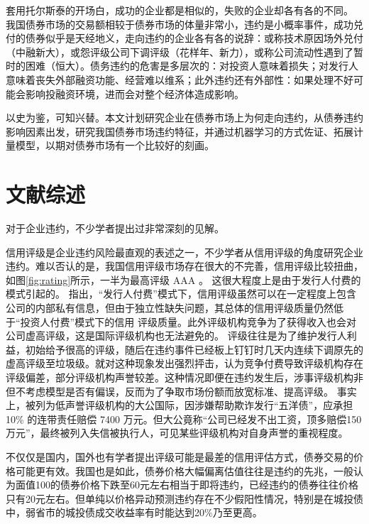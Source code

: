 套用托尔斯泰的开场白，成功的企业都是相似的，失败的企业却各有各的不同。
我国债券市场的交易额相较于债券市场的体量非常小，违约是小概率事件，成功兑付的债券似乎是天经地义，走向违约的企业各有各的说辞：或称技术原因场外兑付（中融新大），或怨评级公司下调评级（花样年、新力），或称公司流动性遇到了暂时的困难（恒大）。债务违约的危害是多层次的：对投资人意味着损失；对发行人意味着丧失外部融资功能、经营难以维系；此外违约还有外部性：如果处理不好可能会影响投融资环境，进而会对整个经济体造成影响。

以史为鉴，可知兴替。本文计划研究企业在债券市场上为何走向违约，从债券违约影响因素出发，研究我国债券市场违约特征，并通过机器学习的方式佐证、拓展计量模型，以期对债券市场有一个比较好的刻画。

\section{文献综述}
\label{sec:zs}
对于企业违约，不少学者提出过非常深刻的见解。

信用评级是企业违约风险最直观的表述之一，不少学者从信用评级的角度研究企业违约。难以否认的是，我国信用评级市场存在很大的不完善，信用评级比较扭曲，如图\ref{fig:rating}所示，一半为最高评级 AAA 。
这很大程度上是由于发行人付费的模式引起的。\Textcite{吴育辉2020} 指出，“发行人付费”模式下，信用评级虽然可以在一定程度上包含公司的内部私有信息，但由于独立性缺失问题，其总体的信用评级质量仍然低于“投资人付费”模式下的信用 评级质量。此外评级机构竞争为了获得收入也会对公司虚高评级，这是国际评级机构也无法避免的。
评级往往是为了维护发行人利益，初始给予很高的评级，随后在违约事件已经板上钉钉时几天内连续下调原先的虚高评级至垃圾级。\Textcite{陈关亭2021多重信用评级与债券融资成本}就对这种现象发出强烈抨击，认为竞争付费导致评级机构存在评级偏差，部分评级机构声誉较差。这种情况即便在违约发生后，涉事评级机构非但不考虑模型是否有偏误，反而为了争取市场份额而放宽标准、提高评级\cite{黄小琳2017债券违约对涉事信用评级机构的影响}。
事实上，被\Textcite{王雄元2013声誉机制}列为低声誉评级机构的大公国际，因涉嫌帮助欺诈发行“五洋债”，应承担 10\% 的连带责任赔偿 7400 万元。但大公竟称“公司已经发不出工资，顶多赔偿150万元”，最终被列入失信被执行人，可见某些评级机构对自身声誉的重视程度。

不仅仅是国内，国外也有学者提出评级可能是最差的信用评估方式\cite{blochlinger2018ratings}，债券交易的价格可能更有效\cite{badoer2019relevance}。我国也是如此，债券价格大幅偏离估值往往是违约的先兆，一般认为面值100的债券价格下跌至60元左右相当于即将违约，已经违约的债券往往价格只有20元左右。但单纯以价格异动预测违约存在不少假阳性情况，特别是在城投债中，弱省市的城投债成交收益率有时能达到20\%乃至更高。

